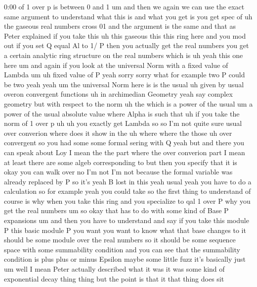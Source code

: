 \begin{unfinished}{0:00}
of  1  over  p  is  between  0  and  1
um  and  then  we  again  we  can  use  the
exact  same  argument  to  understand  what
this  is  and  what  you  get  is  you  get  spec
of  uh  the  gaseous  real  numbers  cross
01  and  the  argument  is  the  same  and  that
as  Peter  explained  if  you  take  this  uh
this  gaseous  this  this  ring  here  and  you
mod  out  if  you  set  Q  equal  Al  to  1/  P
then  you  actually  get  the  real  numbers
you  get  a  certain  analytic  ring
structure  on  the  real  numbers  which  is
uh  yeah  this  one  here  um  and  again  if
you  look  at  the  universal  Norm  with  a
fixed  value  of
Lambda
um  uh  fixed  value  of  P  yeah
sorry  sorry  what  for  example  two  P  could
be  two  yeah  yeah
um  the  universal  Norm
here  is  is  the
usual  uh  given  by  usual  overon
convergent
functions  uh  in  archimedian  Geometry
yeah  say  complex
geometry  but  with  respect  to  the
norm  uh  the  which  is  a  power  of  the
usual  um  a  power  of  the  usual  absolute
value  where  Alpha  is  such  that  uh  if  you
take  the  norm  of  1  over  p  uh  uh  you
exactly  get
Lambda
so  so  I'm  not  quite
sure  usual  over  converion  where  does  it
show  in
the
uh  where  where  the  those  uh  over
convergent  so  you  had  some  some  formal
sering  with  Q  yeah  but  and  there  you  can
speak
about  Loy  I  mean  the  the  part  where  the
over  converion  part  I  mean  at  least
there  are  some  algeb  corresponding  to
but  then  you  specify  that  it
is  okay  you  can  walk  over  no  I'm  not  I'm
not  because  the  formal  variable  was
already  replaced  by  P  so  it's  yeah  B
lost  in  this  yeah
usual  yeah  you  have  to  do  a  calculation
so  for  example  yeah  you  could  take  so
the  first  thing  to  understand  of  course
is  why  when  you  take  this  ring  and  you
specialize  to  qal  1  over  P  why  you  get
the  real  numbers  um  so  okay  that  has  to
do  with  some  kind  of  Base  P
expansions  um  and  then  you  have  to
understand  and  say  if  you  take  this
module  P  this  basic  module  P  you  want
you  want  to  know  what  that  base  changes
to  it  should  be  some  module  over  the
real
numbers  so  it  should  be  some  sequence
space  with  some  summability  condition
and  you  can  see  that  the  summability
condition
is  plus  plus  or  minus  Epsilon  maybe  some
little  fuzz  it's  basically  just
um  well  I  mean  Peter  actually  described
what  it  was  it  was  some  kind  of
exponential  decay  thing  thing  but  the
point  is  that  it  that  thing  does  sit

\end{unfinished}
